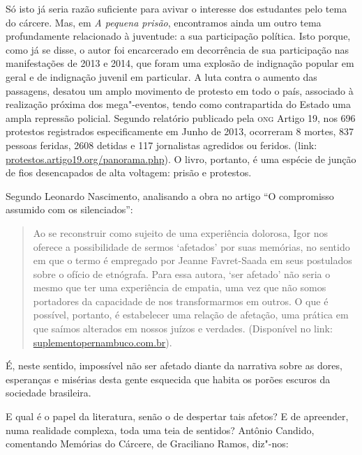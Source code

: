 \documentclass[11pt]{extarticle}
\begin{document}
Só isto já seria razão suficiente para avivar o interesse dos estudantes
pelo tema do cárcere. Mas, em \emph{A
pequena prisão}, encontramos ainda um
outro tema profundamente relacionado à juventude: a sua participação
política. Isto porque, como já se disse, o autor foi encarcerado em
decorrência de sua participação nas manifestações de 2013 e 2014, que
foram uma explosão de indignação popular em geral e de indignação
juvenil em particular. A luta contra o aumento das passagens, desatou um
amplo movimento de protesto em todo o país, associado à realização
próxima dos mega"-eventos, tendo como contrapartida do Estado uma ampla
repressão policial. Segundo relatório publicado pela \textsc{ong} Artigo 19, nos
696 protestos registrados especificamente em Junho de 2013, ocorreram 8
mortes, 837 pessoas feridas, 2608 detidas e 117 jornalistas agredidos ou
feridos. (link: \url{protestos.artigo19.org/panorama.php}). O livro, portanto,
é uma espécie de junção de fios desencapados de alta voltagem: prisão e
protestos.

Segundo Leonardo Nascimento, analisando a obra no artigo ``O
compromisso assumido com os silenciados'':

\begin{quote}
Ao se reconstruir como
sujeito de uma experiência dolorosa, Igor nos oferece a possibilidade de
sermos `afetados' por suas memórias, no sentido em que o termo é
empregado por Jeanne Favret-Saada em seus postulados sobre o ofício de
etnógrafa. Para essa autora, `ser afetado' não seria o mesmo que ter uma
experiência de empatia, uma vez que não somos portadores da capacidade
de nos transformarmos em outros. O que é possível, portanto, é
estabelecer uma relação de afetação, uma prática em que saímos alterados
em nossos juízos e verdades. (Disponível no link: 
\href{https://suplementopernambuco.com.br/artigos/2032-o-compromisso-assumido-com-os-silenciados.html}{suplementopernambuco.com.br}).
\end{quote}

É, neste sentido, impossível não ser afetado diante da narrativa sobre
as dores, esperanças e misérias desta gente esquecida que habita os
porões escuros da sociedade brasileira.

E qual é o papel da literatura, senão o de despertar tais afetos? E de
apreender, numa realidade complexa, toda uma teia de sentidos? Antônio
Candido, comentando Memórias do Cárcere, de Graciliano Ramos, diz"-nos:
\end{document}
